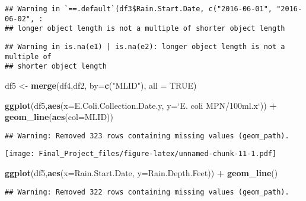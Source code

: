 \documentclass[
]{article}
\newenvironment{Shaded}{\begin{snugshade}}{\end{snugshade}}
\newcommand{\DataTypeTok}[1]{\textcolor[rgb]{0.13,0.29,0.53}{#1}}
\newcommand{\KeywordTok}[1]{\textcolor[rgb]{0.13,0.29,0.53}{\textbf{#1}}}
\newcommand{\NormalTok}[1]{#1}
\newcommand{\OperatorTok}[1]{\textcolor[rgb]{0.81,0.36,0.00}{\textbf{#1}}}
\newcommand{\OtherTok}[1]{\textcolor[rgb]{0.56,0.35,0.01}{#1}}
\newcommand{\StringTok}[1]{\textcolor[rgb]{0.31,0.60,0.02}{#1}}
\begin{document}
\begin{verbatim}
## Warning in `==.default`(df3$Rain.Start.Date, c("2016-06-01", "2016-06-02", :
## longer object length is not a multiple of shorter object length
\end{verbatim}

\begin{verbatim}
## Warning in is.na(e1) | is.na(e2): longer object length is not a multiple of
## shorter object length
\end{verbatim}

\begin{Shaded}
\begin{Highlighting}[]
\NormalTok{df5 <-}\StringTok{ }\KeywordTok{merge}\NormalTok{(df4,df2, }\DataTypeTok{by=}\KeywordTok{c}\NormalTok{(}\StringTok{"MLID"}\NormalTok{), }\DataTypeTok{all =} \OtherTok{TRUE}\NormalTok{)}
\end{Highlighting}
\end{Shaded}

\begin{Shaded}
\begin{Highlighting}[]
\KeywordTok{ggplot}\NormalTok{(df5,}\KeywordTok{aes}\NormalTok{(}\DataTypeTok{x=}\NormalTok{E.Coli.Collection.Date.y, }\DataTypeTok{y=}\StringTok{`}\DataTypeTok{E. coli MPN/100ml.x}\StringTok{`}\NormalTok{)) }\OperatorTok{+}
\StringTok{  }\KeywordTok{geom_line}\NormalTok{(}\KeywordTok{aes}\NormalTok{(}\DataTypeTok{col=}\NormalTok{MLID))}
\end{Highlighting}
\end{Shaded}

\begin{verbatim}
## Warning: Removed 323 rows containing missing values (geom_path).
\end{verbatim}

\texttt{[image: Final\_Project\_files/figure-latex/unnamed-chunk-11-1.pdf]}

\begin{Shaded}
\begin{Highlighting}[]
\KeywordTok{ggplot}\NormalTok{(df5,}\KeywordTok{aes}\NormalTok{(}\DataTypeTok{x=}\NormalTok{Rain.Start.Date, }\DataTypeTok{y=}\NormalTok{Rain.Depth.Feet)) }\OperatorTok{+}
\StringTok{  }\KeywordTok{geom_line}\NormalTok{()}
\end{Highlighting}
\end{Shaded}

\begin{verbatim}
## Warning: Removed 322 rows containing missing values (geom_path).
\end{verbatim}
\end{document}
